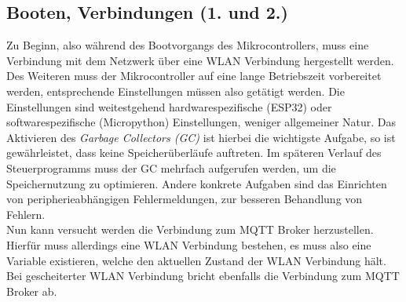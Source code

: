 \documentclass[a4paper, 12pt]{article}
\begin{document}
\subsection{Booten, Verbindungen (1. und 2.)}
Zu Beginn, also während des Bootvorgangs des Mikrocontrollers, muss eine Verbindung mit dem Netzwerk über eine WLAN Verbindung hergestellt werden. Des Weiteren muss der Mikrocontroller auf eine lange Betriebszeit vorbereitet werden, entsprechende Einstellungen müssen also getätigt werden. Die Einstellungen sind weitestgehend hardwarespezifische (ESP32) oder softwarespezifische (Micropython) Einstellungen, weniger allgemeiner Natur. Das Aktivieren des \textit{Garbage Collectors (GC)} ist hierbei die wichtigste Aufgabe, so ist gewährleistet, dass keine Speicherüberläufe auftreten. Im späteren Verlauf des Steuerprogramms muss der GC mehrfach aufgerufen werden, um die Speichernutzung zu optimieren. Andere konkrete Aufgaben sind das Einrichten von peripherieabhängigen Fehlermeldungen, zur besseren Behandlung von Fehlern.\\
Nun kann versucht werden die Verbindung zum MQTT Broker herzustellen. Hierfür muss allerdings eine WLAN Verbindung bestehen, es muss also eine Variable existieren, welche den aktuellen Zustand der WLAN Verbindung hält. Bei gescheiterter WLAN Verbindung bricht ebenfalls die Verbindung zum MQTT Broker ab.
\end{document}
